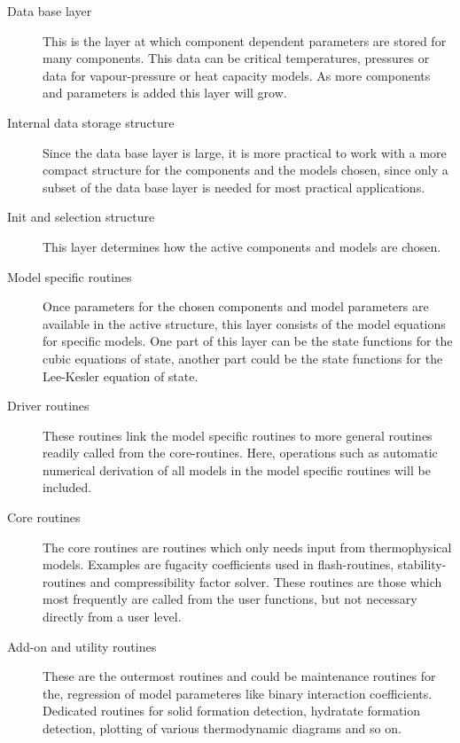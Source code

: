 \documentclass[a4paper, 12pt, english, sintefheadings, sintefcolour]{sintefmemo}
\begin{document}
\begin{description}
\item[Data base layer] This is the layer at which component dependent
  parameters are stored for many components. This data can be critical
  temperatures, pressures or data for vapour-pressure or heat capacity
  models. As more components and parameters is added this layer will grow.
\item[Internal data storage structure] Since the data base layer is large, it
  is more practical to work with a more compact structure for the components
  and the models chosen, since only a subset of the data base layer is needed
  for most practical applications.
\item[Init and selection structure] This layer determines how the active
  components and models are chosen.
\item[Model specific routines] Once parameters for the chosen components and
  model parameters are available in the active structure, this layer consists
  of the model equations for specific models. One part of this layer can be
  the state functions for the cubic equations of state, another part could be
  the state functions for the Lee-Kesler equation of state.
\item[Driver routines] These routines link the model specific routines to more
  general routines readily called from the core-routines. Here, operations
  such as automatic numerical derivation of all models in the model specific
  routines will be included.
\item[Core routines] The core routines are routines which only needs input
  from thermophysical models. Examples are fugacity coefficients used in
  flash-routines, stability-routines and compressibility factor solver. These
  routines are those which most frequently are called from the user functions,
  but not necessary directly from a user level.

\item[Add-on and utility routines] These are the outermost routines and could
  be maintenance routines for the, regression of model parameteres like binary
  interaction coefficients. Dedicated routines for solid formation detection,
  hydratate formation detection, plotting of various thermodynamic diagrams
  and so on.
\end{description}
\end{document}
